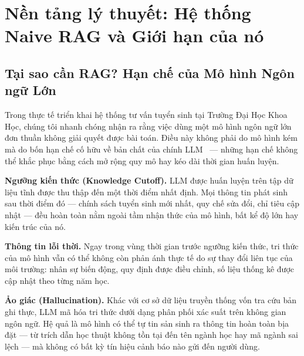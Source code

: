 \documentclass[12pt,a4paper]{report}
\theoremstyle{plain}
\theoremstyle{definition}
\begin{document}
	\clearpage
	

	\newcommand{\mainmatter}{\pagenumbering{arabic}}

	
	\chapter{Nền tảng lý thuyết: Hệ thống Naive RAG và Giới hạn của nó}
	\label{chap:naive_rag}

	\section{Tại sao cần RAG? Hạn chế của Mô hình Ngôn ngữ Lớn}
	\label{sec:llm_limitations}

	Trong thực tế triển khai hệ thống tư vấn tuyển sinh tại Trường Đại Học Khoa
	Học, chúng tôi nhanh chóng nhận ra rằng việc dùng một mô hình ngôn ngữ lớn
	đơn thuần không giải quyết được bài toán. Điều này không phải do mô hình kém
	mà do bốn hạn chế cố hữu về bản chất của chính LLM~\cite{neo4j2024essential}
	--- những hạn chế không thể khắc phục bằng cách mở rộng quy mô hay kéo dài
	thời gian huấn luyện.
	
	\textbf{Ngưỡng kiến thức (Knowledge Cutoff).} LLM được huấn luyện trên tập
	dữ liệu tĩnh được thu thập đến một thời điểm nhất định. Mọi thông tin phát
	sinh sau thời điểm đó --- chính sách tuyển sinh mới nhất, quy chế sửa đổi,
	chỉ tiêu cập nhật --- đều hoàn toàn nằm ngoài tầm nhận thức của mô hình, bất
	kể độ lớn hay kiến trúc của nó.
	
	\textbf{Thông tin lỗi thời.} Ngay trong vùng thời gian trước ngưỡng kiến thức,
	tri thức của mô hình vẫn có thể không còn phản ánh thực tế do sự thay đổi liên
	tục của môi trường: nhân sự biến động, quy định được điều chỉnh, số liệu thống
	kê được cập nhật theo từng năm học.
	
	\textbf{Ảo giác (Hallucination).} Khác với cơ sở dữ liệu truyền thống vốn tra
	cứu bản ghi thực, LLM mã hóa tri thức dưới dạng phân phối xác suất trên không
	gian ngôn ngữ. Hệ quả là mô hình có thể tự tin sản sinh ra thông tin hoàn toàn
	bịa đặt --- từ trích dẫn học thuật không tồn tại đến tên ngành học hay mã ngành
	sai lệch --- mà không có bất kỳ tín hiệu cảnh báo nào gửi đến người dùng.
	
\end{document}
